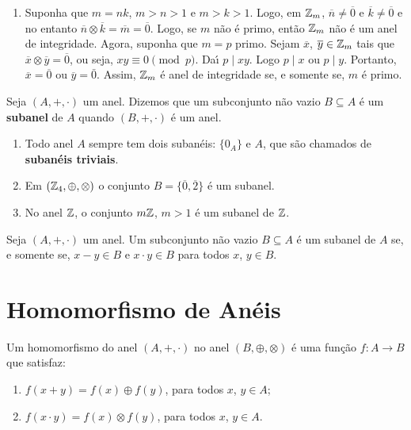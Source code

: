\begin{exemplos}
\begin{enumerate}[label={\arabic*})]
		\item Suponha que $m = nk$, $m > n > 1$ e $m > k > 1$. Logo, em $\mathbb{Z}_m$, $\overline{n} \neq \overline{0}$ e $\overline{k} \neq \overline{0}$ e no entanto $\overline{n} \otimes \overline{k} = \overline{m} = \overline{0}$. Logo, se $m$ n{\~a}o {\'e} primo, ent{\~a}o $\mathbb{Z}_m$ n{\~a}o {\'e} um anel de integridade. Agora, suponha que $m = p$ primo. Sejam $\overline{x}$, $\overline{y} \in \mathbb{Z}_m$ tais que $\overline{x}\otimes \overline{y} = \overline{0}$, ou seja, $xy \equiv 0 \pmod p$. Da{\'\i} $p\mid xy$. Logo $p\mid x$ ou $p\mid y$. Portanto, $\overline{x} = \overline{0}$ ou $\overline{y} = \bar{0}$. Assim, $\mathbb{Z}_m$ {\'e} anel de integridade se, e somente se, $m$ {\'e} primo.
	\end{enumerate}
\end{exemplos}



\begin{definicao}
	Seja $(A, +, \cdot)$ um anel. Dizemos que um subconjunto n{\~a}o vazio $B\subseteq A$ {\'e} um \textbf{subanel} de $A$ quando $(B, +, \cdot)$ \'e um anel.
\end{definicao}

\begin{exemplos}
	\begin{enumerate}[label={\arabic*})]
		\item Todo anel $A$ sempre tem dois suban{\'e}is: $\{0_{A}\}$ e $A$, que s{\~a}o chamados de \textbf{suban{\'e}is triviais}.
		\item Em $(\mathbb{Z}_4,\oplus,\otimes)$ o conjunto $B = \{\overline{0}, \overline{2}\}$ \'e um subanel.
		\item No anel $\mathbb{Z}$, o conjunto $m\mathbb{Z}$, $m > 1$ {\'e} um subanel de $\mathbb{Z}$.
	\end{enumerate}	
\end{exemplos}

\begin{proposicao}
	Seja $(A, +,\cdot)$ um anel. Um subconjunto n{\~a}o vazio $B\subseteq A$ {\'e} um subanel de $A$ se, e somente se, $x - y \in B$ e $x\cdot y \in B$ para todos $x$, $y \in B$.
\end{proposicao}

\section{Homomorfismo de Anéis} %
\label{sec:homomorfismo_de_aneis}

\begin{definicao}
	Um homomorfismo do anel $(A, +, \cdot)$ no anel $(B, \oplus, \otimes)$ {\'e} uma fun{\c c}{\~a}o $f : A \to B$ que satisfaz:
	\begin{enumerate}[label={\roman*})]
		\item $f(x + y) = f(x) \oplus f(y)$, para todos $x$, $y \in A$;
		\item $f(x \cdot y) = f(x)\otimes f(y)$, para todos $x$, $y \in A$.
	\end{enumerate}
\end{definicao}

